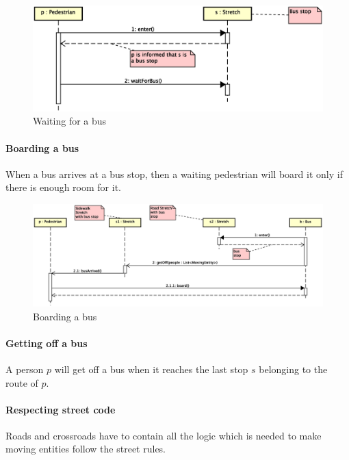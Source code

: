 \begin{figure}[H]
  \centering
  \includegraphics[width=\columnwidth,trim=1 0 2 0,clip]
    {images/solution/bus_waiting.eps}
  \caption{Waiting for a bus}
  \label{fig:app-inter-wait-bus}
\end{figure}

\paragraph{Boarding a bus}
When a bus arrives at a bus stop, then a waiting pedestrian will board it only
if there is enough room for it.

\begin{figure}[H]
  \centering
  \includegraphics[width=\columnwidth,trim=1 0 0 0,clip]
    {images/solution/bus_boarding.eps}
  \caption{Boarding a bus}
  \label{fig:app-inter-board-bus}
\end{figure}

\paragraph{Getting off a bus} A person $p$ will get off a bus when it reaches
the last stop $s$ belonging to the route of $p$.

\paragraph{Respecting street code} Roads and crossroads have to contain
all the logic which is needed to make moving entities follow the street rules.

